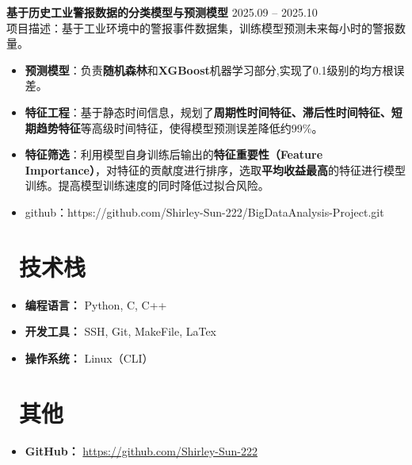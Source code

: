\documentclass[11pt]{article}
\newlength{\interProjectSpacing}
\newcommand{\projectsep}{\vspace{\interProjectSpacing}}
\newlength{\intraProjectTitleSep}
\newcommand{\titlebreak}{\\[\intraProjectTitleSep]}
\newlength{\intraProjectListTopSep}
\begin{document}
\projectsep


\textbf{基于历史工业警报数据的分类模型与预测模型} \hfill 2025.09 -- 2025.10 \titlebreak
项目描述：基于工业环境中的警报事件数据集，训练模型预测未来每小时的警报数量。
\begin{itemize}[nosep, topsep=\intraProjectListTopSep]
    \item \textbf{预测模型}：负责\textbf{随机森林}和\textbf{XGBoost}机器学习部分,实现了0.1级别的均方根误差。
    \item \textbf{特征工程}：基于静态时间信息，规划了\textbf{周期性时间特征、滞后性时间特征、短期趋势特征}等高级时间特征，使得模型预测误差降低约99\%。
    \item \textbf{特征筛选}：利用模型自身训练后输出的\textbf{特征重要性（Feature Importance）}，对特征的贡献度进行排序，选取\textbf{平均收益最高}的特征进行模型训练。提高模型训练速度的同时降低过拟合风险。
    \item github：https://github.com/Shirley-Sun-222/BigDataAnalysis-Project.git
\end{itemize}

\section{\makebox[\widthof{\faCogs}][c]{\color{CVBlue}\faCogs}\ 技术栈}
\begin{itemize}[nosep]
    \item \textbf{编程语言：} Python, C, C++
    \item \textbf{开发工具：} SSH, Git, MakeFile, LaTex
    \item \textbf{操作系统：} Linux（CLI）
\end{itemize}
    
\section{\makebox[\widthof{\faInfo}][c]{\color{CVBlue}\faInfo}\ 其他}
\begin{itemize}[parsep=0.5ex]
    \item \textbf{GitHub：} \href{https://github.com/Shirley-Sun-222}{https://github.com/Shirley-Sun-222} 
\end{itemize}
\end{document}
